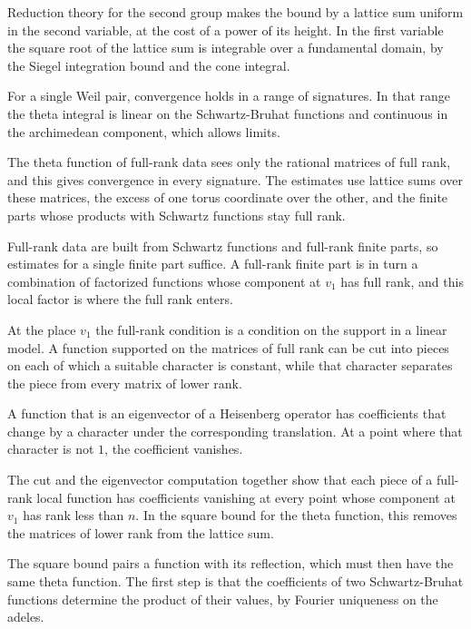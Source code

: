 Reduction theory for the second group makes the bound by a lattice sum uniform
in the second variable, at the cost of a power of its height. In the first
variable the square root of the lattice sum is integrable over a fundamental
domain, by the Siegel integration bound and the cone integral.

For a single Weil pair, convergence holds in a range of signatures. In that
range the theta integral is linear on the Schwartz-Bruhat functions and
continuous in the archimedean component, which allows limits.

The theta function of full-rank data sees only the rational matrices of full
rank, and this gives convergence in every signature. The estimates use lattice
sums over these matrices, the excess of one torus coordinate over the other,
and the finite parts whose products with Schwartz functions stay full rank.

Full-rank data are built from Schwartz functions and full-rank finite parts,
so estimates for a single finite part suffice. A full-rank finite part is in
turn a combination of factorized functions whose component at $v_1$ has full
rank, and this local factor is where the full rank enters.

At the place $v_1$ the full-rank condition is a condition on the support in a
linear model. A function supported on the matrices of full rank can be cut into
pieces on each of which a suitable character is constant, while that character
separates the piece from every matrix of lower rank.

A function that is an eigenvector of a Heisenberg operator has coefficients
that change by a character under the corresponding translation. At a point
where that character is not $1$, the coefficient vanishes.

The cut and the eigenvector computation together show that each piece of a
full-rank local function has coefficients vanishing at every point whose
component at $v_1$ has rank less than $n$. In the square bound for the theta
function, this removes the matrices of lower rank from the lattice sum.

The square bound pairs a function with its reflection, which must then have the
same theta function. The first step is that the coefficients of two
Schwartz-Bruhat functions determine the product of their values, by Fourier
uniqueness on the adeles.

